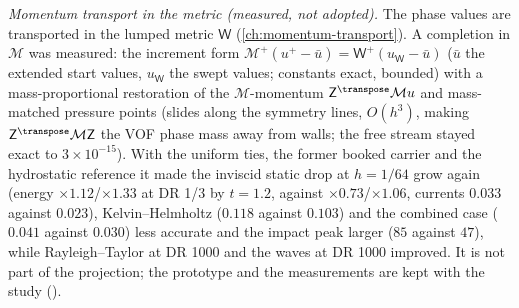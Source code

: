 \emph{Momentum transport in the metric (measured, not adopted).} The phase
values are transported in the lumped metric $\mathsf W$
(\cref{ch:momentum-transport}). A completion in $\mathcal M$ was measured: the increment
form $\mathcal M^{+}(u^{+}-\bar u)=\mathsf W^{+}(u_{\mathsf W}-\bar u)$ ($\bar u$
the extended start values, $u_{\mathsf W}$ the swept values; constants exact,
bounded) with a mass-proportional restoration of the $\mathcal M$-momentum
$\mathsf Z^{\transpose}\mathcal Mu$ and mass-matched pressure points (slides
along the symmetry lines, $O(h^3)$, making $\mathsf Z^{\transpose}\mathcal M\mathsf Z$
the VOF phase mass away from walls; the free stream stayed exact to
$3\times10^{-15}$). With the uniform ties, the former booked carrier and the
hydrostatic reference it made the inviscid static drop at $h=1/64$ grow again
(energy $\times1.12$/$\times1.33$ at DR 1/3 by $t=1.2$, against $\times0.73$/$\times1.06$,
currents $0.033$ against $0.023$), Kelvin--Helmholtz ($0.118$ against $0.103$) and
the combined case ($0.041$ against $0.030$) less accurate and the impact peak
larger ($85$ against $47$), while Rayleigh--Taylor at DR 1000 and the waves at
DR 1000 improved. It is not part of the projection; the prototype and the
measurements are kept with the study ().

